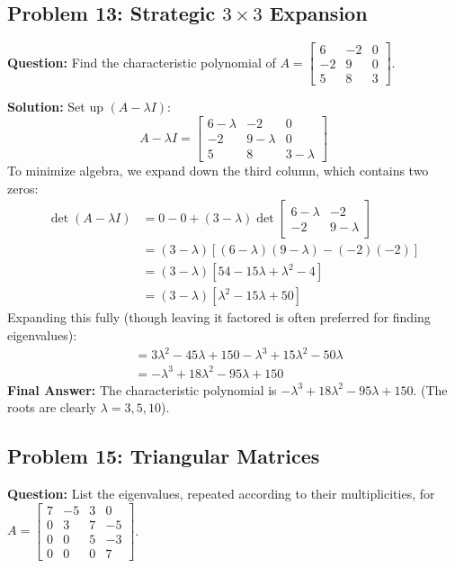 \documentclass[11pt, a4paper]{article}
\theoremstyle{definition}
\theoremstyle{remark}
\begin{document}
\subsection{Problem 13: Strategic $3 \times 3$ Expansion}
\textbf{Question:} Find the characteristic polynomial of $A = \begin{bmatrix} 6 & -2 & 0 \\ -2 & 9 & 0 \\ 5 & 8 & 3 \end{bmatrix}$.

\textbf{Solution:}
Set up $(A - \lambda I)$:
\[ A - \lambda I = \begin{bmatrix} 6 - \lambda & -2 & 0 \\ -2 & 9 - \lambda & 0 \\ 5 & 8 & 3 - \lambda \end{bmatrix} \]
To minimize algebra, we expand down the third column, which contains two zeros:
\begin{align*}
    \det(A - \lambda I) &= 0 - 0 + (3 - \lambda) \det \begin{bmatrix} 6 - \lambda & -2 \\ -2 & 9 - \lambda \end{bmatrix} \\
    &= (3 - \lambda) \left[ (6 - \lambda)(9 - \lambda) - (-2)(-2) \right] \\
    &= (3 - \lambda) \left[ 54 - 15\lambda + \lambda^2 - 4 \right] \\
    &= (3 - \lambda) \left[ \lambda^2 - 15\lambda + 50 \right]
\end{align*}
Expanding this fully (though leaving it factored is often preferred for finding eigenvalues):
\begin{align*}
    &= 3\lambda^2 - 45\lambda + 150 - \lambda^3 + 15\lambda^2 - 50\lambda \\
    &= -\lambda^3 + 18\lambda^2 - 95\lambda + 150
\end{align*}
\textbf{Final Answer:} The characteristic polynomial is $-\lambda^3 + 18\lambda^2 - 95\lambda + 150$. (The roots are clearly $\lambda = 3, 5, 10$).

\subsection{Problem 15: Triangular Matrices}
\textbf{Question:} List the eigenvalues, repeated according to their multiplicities, for $A = \begin{bmatrix} 7 & -5 & 3 & 0 \\ 0 & 3 & 7 & -5 \\ 0 & 0 & 5 & -3 \\ 0 & 0 & 0 & 7 \end{bmatrix}$.
\end{document}
